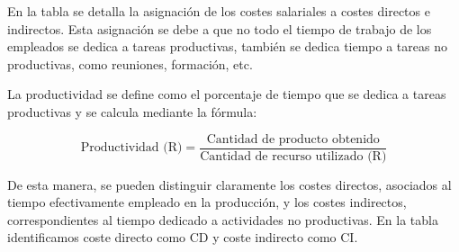
En la tabla  se detalla la asignación de los costes 
salariales a costes directos e indirectos. Esta asignación se debe a que no todo el tiempo de trabajo de los empleados se dedica a tareas productivas, 
también se dedica tiempo a tareas no productivas, como reuniones, formación, etc. 

La productividad se define como el porcentaje de tiempo que se dedica a tareas productivas y se calcula mediante la fórmula:

\[
\text{Productividad (R)} = \frac{\text{Cantidad de producto obtenido}}{\text{Cantidad de recurso utilizado (R)}}
\]

De esta manera, se pueden distinguir claramente los costes directos, asociados al tiempo efectivamente empleado en la producción, y los costes indirectos, correspondientes al tiempo dedicado a actividades no productivas.
En la tabla identificamos coste directo como CD y coste indirecto como CI.


